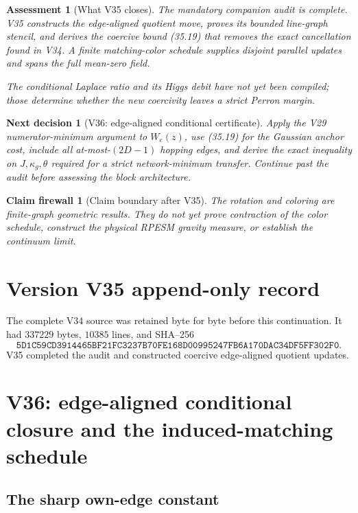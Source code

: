 \documentclass[11pt]{article}
\newtheorem{firewall}[theorem]{Claim firewall}
\newtheorem{decision}[theorem]{Next decision}
\newtheorem{assessment}[theorem]{Assessment}
\theoremstyle{remark}
\begin{document}
\begin{assessment}[What V35 closes]
\label{ass:v17v35-status}
The mandatory companion audit is complete.  V35 constructs the
edge-aligned quotient move, proves its bounded line-graph stencil, and
derives the coercive bound (35.19) that removes the exact cancellation
found in V34.  A finite matching-color schedule supplies disjoint
parallel updates and spans the full mean-zero field.

The conditional Laplace ratio and its Higgs debit have not yet been
compiled; those determine whether the new coercivity leaves a strict
Perron margin.
\end{assessment}

\begin{decision}[V36: edge-aligned conditional certificate]
\label{dec:v17v35-next}
Apply the V29 numerator-minimum argument to \(W_e(z)\), use (35.19) for
the Gaussian anchor cost, include all at-most-\((2D-1)\) hopping edges,
and derive the exact inequality on \(J,\kappa_g,\theta\) required for a
strict network-minimum transfer.  Continue past the audit before
assessing the block architecture.
\end{decision}

\begin{firewall}[Claim boundary after V35]
\label{fire:v17v35}
The rotation and coloring are finite-graph geometric results.  They do
not yet prove contraction of the color schedule, construct the physical
RPESM gravity measure, or establish the continuum limit.
\end{firewall}

\section*{Version V35 append-only record}
The complete V34 source was retained byte for byte before this
continuation.  It had \(337229\) bytes, \(10385\) lines, and SHA--256
\[
 \texttt{5D1C59CD3914465BF21FC3237B70FE168D00995247FB6A170DAC34DF5FF302F0}.
\]
V35 completed the audit and constructed coercive edge-aligned quotient
updates.


\section{V36: edge-aligned conditional closure and the induced-matching schedule}
\label{sec:v17v36}

\subsection{The sharp own-edge constant}
\end{document}
